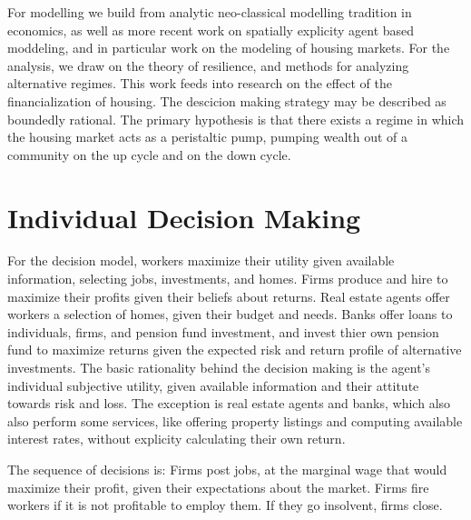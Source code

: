For modelling we build from analytic neo-classical modelling tradition in economics, as well as more recent work on spatially explicity agent based moddeling, and in particular work on the modeling of housing markets. For the analysis, we draw on the theory of resilience, and methods for analyzing alternative regimes. 
This work feeds into research on the effect of the financialization of housing. 
The descicion making strategy may be described as boundedly rational. %
The primary hypothesis is that there exists a regime in which the housing market acts as a peristaltic pump, pumping wealth out of a community on the up cycle and on the down cycle. 



\section*{Individual Decision Making}
For the decision model, workers maximize their utility given available information, selecting jobs, investments, and homes. Firms produce and hire to maximize their profits given their beliefs about returns. Real estate agents offer workers a selection of homes, given their budget and needs. Banks offer loans to individuals, firms, and pension fund investment, and invest thier own pension fund to maximize returns given the expected risk and return profile of alternative investments. %
The basic rationality behind the decision making is the agent's individual subjective utility, given available information and their attitute towards risk and loss. The exception is real estate agents and banks, which also also perform some services, like offering property listings and computing available interest rates, without explicity calculating their own return.

The sequence of decisions is:
Firms post jobs, at the marginal wage that would maximize their profit, given their expectations about the market. Firms fire workers if it is not profitable to employ them. If they go insolvent, firms close. 

